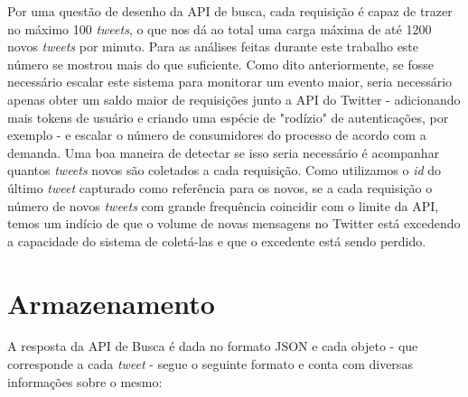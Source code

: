 Por uma questão de desenho da API de busca, cada requisição é capaz de trazer no máximo 100 \textit{tweets}, o que nos dá ao total uma carga máxima de até 1200 novos \textit{tweets} por minuto. Para as análises feitas durante este trabalho este número se mostrou mais do que suficiente. Como dito anteriormente, se fosse necessário escalar este sistema para monitorar um evento maior, seria necessário apenas obter um saldo maior de requisições junto a API do Twitter - adicionando mais tokens de usuário e criando uma espécie de "rodízio" de autenticações, por exemplo - e escalar o número de consumidores do processo de acordo com a demanda. Uma boa maneira de detectar se isso seria necessário é acompanhar quantos \textit{tweets} novos são coletados a cada requisição. Como utilizamos o \textit{id} do último \textit{tweet} capturado como referência para os novos, se a cada requisição o número de novos \textit{tweets} com grande frequência coincidir com o limite da API, temos um indício de que o volume de novas mensagens no Twitter está excedendo a capacidade do sistema de coletá-las e que o excedente está sendo perdido.

\section{Armazenamento}
A resposta da API de Busca é dada no formato JSON e cada objeto - que corresponde a cada \textit{tweet} - segue o seguinte formato e conta com diversas informações sobre o mesmo: 

